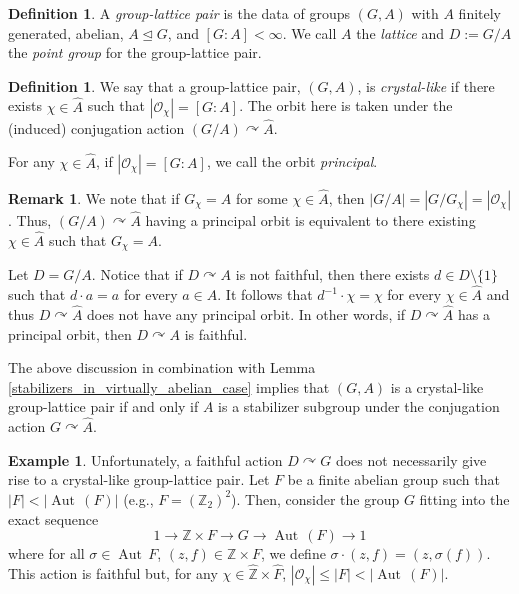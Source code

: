 \documentclass[11pt, twoside]{amsart}
\newcommand{\te}[1]{\operatorname{#1}}
\newcommand{\zn}{\mathbb{Z}}
\newcommand{\mc}{\mathcal}
\newcommand{\wh}{\widehat}
\renewcommand{\l}{\left}
\renewcommand{\r}{\right}
\theoremstyle{definition}
\newtheorem{defn}[thm]{Definition}
\newtheorem{ex}[thm]{Example}
\newtheorem{rmk}[thm]{Remark}
\begin{document}
\begin{defn}
    A \textit{group-lattice pair} is the data of groups $(G,A)$ with $A$ finitely generated, abelian, $A\trianglelefteq G$, and $[G:A]<\infty$. We call $A$ the \textit{lattice} and $D:=G/A$ the \textit{point group} for the group-lattice pair.
\end{defn}

\begin{defn}\label{defn:crystal-like}
    We say that a group-lattice pair, $(G,A)$, is \textit{crystal-like} if there exists $\chi \in \widehat{A}$ such that $|\mc{O}_{\chi}|=[G:A]$. The orbit here is taken under the (induced) conjugation action $ (G/A)\curvearrowright \widehat{A}$.
\end{defn}
For any $\chi\in \wh{A}$, if $|\mc{O}_{\chi}|=[G:A]$, we call the orbit \emph{principal}. 

\begin{rmk}\label{rmk:char_of_cryst_like}
We note that if $G_{\chi}=A$ for some $\chi\in\wh{A}$, then $|G\slash A|=|G\slash G_{\chi}|=|\mc{O}_{\chi}|$. Thus, $(G\slash A)\curvearrowright \wh{A}$ having a principal orbit is equivalent to there existing $\chi\in\wh{A}$ such that $G_{\chi}=A$. 

Let $D=G\slash A$. Notice that if $D\curvearrowright A$ is not faithful, then there exists $d\in D\setminus\{1\}$ such that $d\cdot a=a$ for every $a\in A$. It follows that $d^{-1}\cdot \chi=\chi$ for every $\chi\in \widehat{A}$ and thus $D\curvearrowright \widehat{A}$ does not have any principal orbit. In other words, if $D\curvearrowright \widehat{A}$ has a principal orbit, then $D\curvearrowright A$ is faithful.

The above discussion in combination with Lemma \ref{stabilizers_in_virtually_abelian_case} implies that $(G,A)$ is a crystal-like group-lattice pair if and only if $A$ is a stabilizer subgroup under the conjugation action $G\curvearrowright \wh{A}$.
\end{rmk}



\begin{ex}\label{ex:not_crystal_like}
Unfortunately, a faithful action $D\curvearrowright G$ does not necessarily give rise to a crystal-like group-lattice pair. Let $F$ be a finite abelian group such that $|F|<|\te{Aut}\,(F)|$ (e.g., $F=\l(\zn_2\r)^2$).
Then, consider the group $G$ fitting into the exact sequence
\[1\rightarrow \zn\times F\rightarrow G\rightarrow \te{Aut}\,(F)\rightarrow 1\]
    where for all $\sigma\in\te{Aut}\,F$, $(z,f)\in \zn\times F$, we define $\sigma\cdot (z,f)=(z,\sigma(f))$. This action is faithful but, for any $\chi\in \wh{\zn}\times \wh{F}$, $|\mc{O}_{\chi}|\leq |F|<|\te{Aut}\,(F)|$.
\end{ex}
\end{document}
